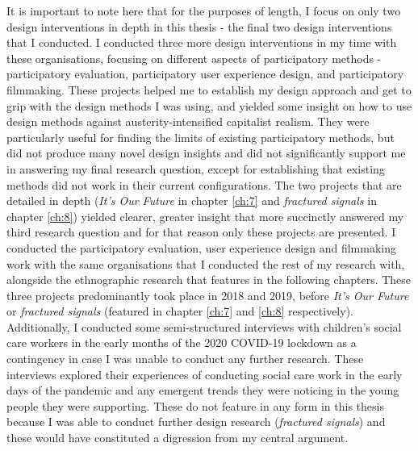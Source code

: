 It is important to note here that for the purposes of length, I focus on only two design interventions in depth in this thesis - the final two design interventions that I conducted. I conducted three more design interventions in my time with these organisations, focusing on different aspects of participatory methods - participatory evaluation, participatory user experience design, and participatory filmmaking. These projects helped me to establish my design approach and get to grip with the design methods I was using, and yielded some insight on how to use design methods against austerity-intensified capitalist realism. They were particularly useful for finding the limits of existing participatory methods, but did not produce many novel design insights and did not significantly support me in answering my final research question, except for establishing that existing methods did not work in their current configurations. The two projects that are detailed in depth (\textit{It's Our Future} in chapter \ref{ch:7} and \textit{fractured signals} in chapter \ref{ch:8}) yielded clearer, greater insight that more succinctly answered my third research question and for that reason only these projects are presented. I conducted the participatory evaluation, user experience design and filmmaking work with the same organisations that I conducted the rest of my research with, alongside the ethnographic research that features in the following chapters. These three projects predominantly took place in 2018 and 2019, before \textit{It's Our Future} or \textit{fractured signals} (featured in chapter \ref{ch:7} and \ref{ch:8} respectively). Additionally, I conducted some semi-structured interviews with children's social care workers in the early months of the 2020 COVID-19 lockdown as a contingency in case I was unable to conduct any further research. These interviews explored their experiences of conducting social care work in the early days of the pandemic and any emergent trends they were noticing in the young people they were supporting. These do not feature in any form in this thesis because I was able to conduct further design research (\textit{fractured signals}) and these would have constituted a digression from my central argument.


